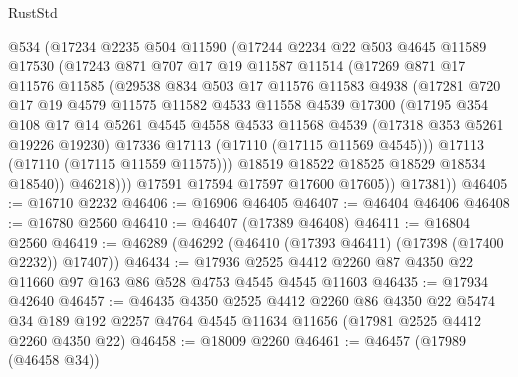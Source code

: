 \begin{lexlean}{RustStd}
\begin{coremodule}
            @534
            (@17234
              @2235
              @504
              @11590
              (@17244
                @2234
                @22
                @503
                @4645
                @11589
                @17530
                (@17243
                  @871
                  @707
                  @17
                  @19
                  @11587
                  @11514
                  (@17269
                    @871
                    @17
                    @11576
                    @11585
                    (@29538
                      @834
                      @503
                      @17
                      @11576
                      @11583
                      @4938
                      (@17281
                        @720
                        @17
                        @19
                        @4579
                        @11575
                        @11582
                        @4533
                        @11558
                        @4539
                        @17300
                        (@17195
                          @354
                          @108
                          @17
                          @14
                          @5261
                          @4545
                          @4558
                          @4533
                          @11568
                          @4539
                          (@17318 @353 @5261 @19226 @19230)
                          @17336
                          @17113
                          (@17110 (@17115 @11569 @4545)))
                        @17113
                        (@17110 (@17115 @11559 @11575)))
                      @18519
                      @18522
                      @18525
                      @18529
                      @18534
                      @18540))
                  @46218)))
            @17591
            @17594
            @17597
            @17600
            @17605))
        @17381))
@46405 := @16710 @2232
@46406 := @16906 @46405
@46407 := @46404 @46406
@46408 := @16780 @2560
@46410 := @46407 (@17389 @46408)
@46411 := @16804 @2560
@46419 := @46289 (@46292 (@46410 (@17393 @46411) (@17398 (@17400 @2232)) @17407))
@46434 := @17936 @2525 @4412 @2260 @87 @4350 @22 @11660 @97 @163 @86 @528 @4753 @4545 @4545 @11603
@46435 := @17934 @42640
@46457 := @46435
    @4350
    @2525
    @4412
    @2260
    @86
    @4350
    @22
    @5474
    @34
    @189
    @192
    @2257
    @4764
    @4545
    @11634
    @11656
    (@17981 @2525 @4412 @2260 @4350 @22)
@46458 := @18009 @2260
@46461 := @46457 (@17989 (@46458 @34))

\end{coremodule}
\end{lexlean}
